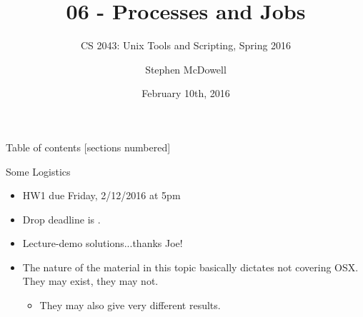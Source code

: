 %
%
%
%


%
%
\title{06 \-- Processes and Jobs}
\subtitle{CS 2043: Unix Tools and Scripting, Spring 2016 \cite{prevSemesters}}
\date{February 10th, 2016}
\author{Stephen McDowell}


\maketitle

\begin{frame}{Table of contents}
  [sections numbered]
  \tableofcontents[hideallsubsections]
\end{frame}

\begin{frame}{Some Logistics}
  \begin{itemize}[<+- | alert@+>]
    \item HW1 due Friday, 2/12/2016 at 5pm
    \item Drop deadline is .
    \item Lecture-demo solutions...thanks Joe!
    \item The nature of the material in this topic basically dictates not covering OSX.  They may exist, they
          may not.
    \begin{itemize}[<+- | alert@+>]
      \item They may also give very different results.
    \end{itemize}
  \end{itemize}
\end{frame}

